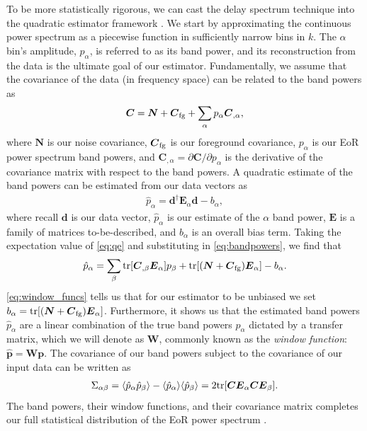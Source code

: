 \documentclass[a4paper,fleqn,usenatbib]{mnras}
\def\d{\boldsymbol{d}}
\def\E{\boldsymbol{E}}
\def\N{\boldsymbol{N}}
\def\p{\boldsymbol{p}}
\def\C{\boldsymbol{C}}
\def\W{\boldsymbol{W}}
\def\Cfg{\boldsymbol{C}_{\rm fg}}
\def\tr{{\rm tr}}
\begin{document}
To be more statistically rigorous, we can cast the delay spectrum technique into the quadratic estimator framework \citep{Hamilton1997, Tegmark1997, Liu2014a}.
We start by approximating the continuous power spectrum as a piecewise function in sufficiently narrow bins in $k$.
The $\alpha$ bin's amplitude, $p_\alpha$, is referred to as its band power, and its reconstruction from the data is the ultimate goal of our estimator.
Fundamentally, we assume that the covariance of the data (in frequency space) can be related to the band powers as
\begin{align}
\label{eq:bandpowers}
\C = \N + \Cfg + \sum_\alpha p_\alpha \C_{,\alpha},
\end{align}
where $\N$ is our noise covariance, $\Cfg$ is our foreground covariance, $p_\alpha$ is our EoR power spectrum band powers, and $\C_{,\alpha} = \partial\C/\partial p_\alpha$ is the derivative of the covariance matrix with respect to the band powers.
A quadratic estimate of the band powers can be estimated from our data vectors as
\begin{align}
\label{eq:qe}
\hat{p}_\alpha = \d^\dagger\E_\alpha\d - b_\alpha,
\end{align}
where recall $\d$ is our data vector, $\hat{p}_\alpha$ is our estimate of the $\alpha$ band power, $\E$ is a family of matrices to-be-described, and $b_\alpha$ is an overall bias term.
Taking the expectation value of \autoref{eq:qe} and substituting in \autoref{eq:bandpowers}, we find that 
\begin{align}
\label{eq:window_funcs}
\hat{p}_\alpha = \sum_\beta\tr[\C_{,\beta}\E_\alpha]p_{\beta} + \tr[(\N + \Cfg)\E_\alpha] - b_\alpha.
\end{align}
\autoref{eq:window_funcs} tells us that for our estimator to be unbiased we set $b_\alpha = \tr[(\N+\Cfg)\E_\alpha]$.
Furthermore, it shows us that the estimated band powers $\hat{p}_\alpha$ are a linear combination of the true band powers $p_\alpha$ dictated by a transfer matrix, which we will denote as $\W$, commonly known as the \emph{window function}: $\hat{\p} = \W\p$.
The covariance of our band powers subject to the covariance of our input data can be written as
\begin{align}
\label{eq:qe_C}
\Sigma_{\alpha\beta} = \langle \hat{p}_\alpha\hat{p}_\beta\rangle - \langle \hat{p}_\alpha\rangle\langle \hat{p}_\beta\rangle = 2\tr[\C\E_\alpha\C\E_\beta].
\end{align}
The band powers, their window functions, and their covariance matrix completes our full statistical distribution of the EoR power spectrum \citep{Liu2014a}.
\end{document}
